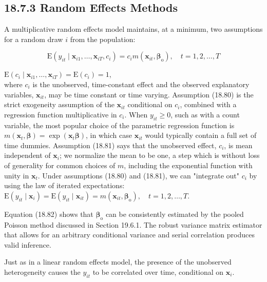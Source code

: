 \documentclass[10pt]{article}
\begin{document}
\subsection*{18.7.3 Random Effects Methods}
A multiplicative random effects model maintains, at a minimum, two assumptions for a random draw $i$ from the population:


\begin{equation*}
\mathrm{E}\left(y_{i t} \mid \mathbf{x}_{i 1}, \ldots, \mathbf{x}_{i T}, c_{i}\right)=c_{i} m\left(\mathbf{x}_{i t}, \boldsymbol{\beta}_{\mathrm{o}}\right), \quad t=1,2, \ldots, T \tag{18.80}
\end{equation*}


$\mathrm{E}\left(c_{i} \mid \mathbf{x}_{i 1}, \ldots, \mathbf{x}_{i T}\right)=\mathrm{E}\left(c_{i}\right)=1$,\\
where $c_{i}$ is the unobserved, time-constant effect and the observed explanatory variables, $\mathbf{x}_{i t}$, may be time constant or time varying. Assumption (18.80) is the strict exogeneity assumption of the $\mathbf{x}_{i t}$ conditional on $c_{i}$, combined with a regression function multiplicative in $c_{i}$. When $y_{i t} \geq 0$, such as with a count variable, the most popular choice of the parametric regression function is $m\left(\mathbf{x}_{t}, \boldsymbol{\beta}\right)=\exp \left(\mathbf{x}_{t} \boldsymbol{\beta}\right)$, in which case $\mathbf{x}_{i t}$ would typically contain a full set of time dummies. Assumption (18.81) says that the unobserved effect, $c_{i}$, is mean independent of $\mathbf{x}_{i}$; we normalize the mean to be one, a step which is without loss of generality for common choices of $m$, including the exponential function with unity in $\mathbf{x}_{t}$. Under assumptions (18.80) and (18.81), we can "integrate out" $c_{i}$ by using the law of iterated expectations:\\
$\mathrm{E}\left(y_{i t} \mid \mathbf{x}_{i}\right)=\mathrm{E}\left(y_{i t} \mid \mathbf{x}_{i t}\right)=m\left(\mathbf{x}_{i t}, \boldsymbol{\beta}_{\mathrm{o}}\right), \quad t=1,2, \ldots, T$.

Equation (18.82) shows that $\boldsymbol{\beta}_{\mathrm{o}}$ can be consistently estimated by the pooled Poisson method discussed in Section 19.6.1. The robust variance matrix estimator that allows for an arbitrary conditional variance and serial correlation produces valid inference.

Just as in a linear random effects model, the presence of the unobserved heterogeneity causes the $y_{i t}$ to be correlated over time, conditional on $\mathbf{x}_{i}$.
\end{document}
